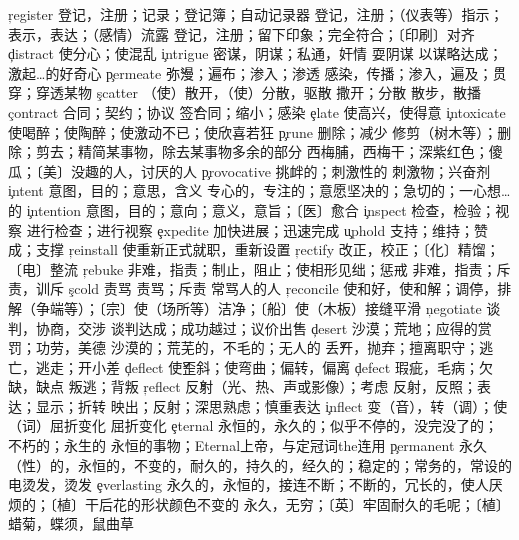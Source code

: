 \begin{multicols}{2}
\c{register}  \n 登记，注册；记录；登记簿；自动记录器 \vt 登记，注册；（仪表等）指示；表示，表达；（感情）流露 \vi 登记，注册；留下印象；完全符合；〔印刷〕对齐 
\c{distract}  \vt 使分心；使混乱
\c{intrigue}  \n 密谋，阴谋；私通，奸情 \vi 耍阴谋 \vt 以谋略达成；激起…的好奇心
\c{permeate}  \v 弥漫；遍布；渗入；渗透 \vi 感染，传播；渗入，遍及；贯穿；穿透某物
\c{scatter}  \vt （使）散开，（使）分散，驱散 \vi 撒开；分散 \n 散步，散播
\c{contract}  \n 合同；契约；协议 \v 签合同；缩小；感染
\c{elate}  \vt 使高兴，使得意
\c{intoxicate}  \vt 使喝醉；使陶醉；使激动不已；使欣喜若狂
\c{prune}  \vi 删除；减少 \vt 修剪（树木等）；删除；剪去；精简某事物，除去某事物多余的部分 \n 西梅脯，西梅干；深紫红色；傻瓜；〔美〕没趣的人，讨厌的人
\c{provocative}  \a 挑衅的；刺激性的 \n 刺激物；兴奋剂 
\c{intent}  \n 意图，目的；意思，含义 \a 专心的，专注的；意愿坚决的；急切的；一心想…的
\c{intention}  \n 意图，目的；意向；意义，意旨；〔医〕愈合
\c{inspect}  \vt 检查，检验；视察 \vi 进行检查；进行视察
\c{expedite}  \vt 加快进展；迅速完成
\c{uphold}  \vt 支持；维持；赞成；支撑
\c{reinstall}  \vt 使重新正式就职，重新设置
\c{rectify}  \vt 改正，校正；〔化〕精馏；〔电〕整流
\c{rebuke}  \vt 非难，指责；制止，阻止；使相形见绌；惩戒 \n 非难，指责；斥责，训斥
\c{scold}  \vt 责骂 \vi 责骂；斥责 \n 常骂人的人
\c{reconcile}  \vt 使和好，使和解；调停，排解（争端等）；〔宗〕使（场所等）洁净；〔船〕使（木板）接缝平滑 
\c{negotiate}  \vi 谈判，协商，交涉 \vt 谈判达成；成功越过；议价出售
\c{desert}  \n 沙漠；荒地；应得的赏罚；功劳，美德 \a 沙漠的；荒芜的，不毛的；无人的 \v 丢开，抛弃；擅离职守；逃亡，逃走；开小差
\c{deflect}  \v 使歪斜；使弯曲；偏转，偏离
\c{defect}  \n 瑕疵，毛病；欠缺，缺点 \vi 叛逃；背叛
\c{reflect}  \v 反射（光、热、声或影像）；考虑 \vt 反射，反照；表达；显示；折转 \vi 映出；反射；深思熟虑；慎重表达
\c{inflect}  \vt 变（音），转（调）；使（词）屈折变化 \vi 屈折变化
\c{eternal}  \a 永恒的，永久的；似乎不停的，没完没了的；不朽的；永生的 \n 永恒的事物；Eternal上帝，与定冠词the连用
\c{permanent}  \a 永久（性）的，永恒的，不变的，耐久的，持久的，经久的；稳定的；常务的，常设的 \n 电烫发，烫发
\c{everlasting}  \a 永久的，永恒的，接连不断；不断的，冗长的，使人厌烦的；〔植〕干后花的形状颜色不变的 \n 永久，无穷；〔英〕牢固耐久的毛呢；〔植〕蜡菊，蝶须，鼠曲草

\end{multicols}

